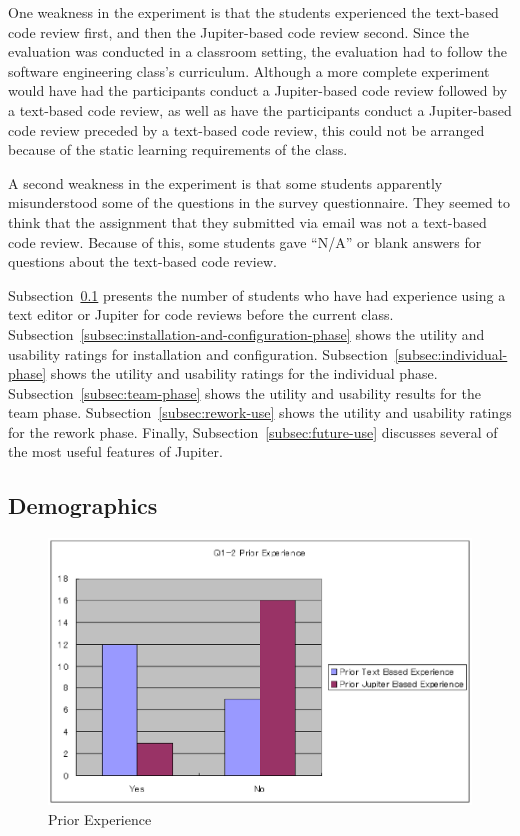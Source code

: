 One weakness in the experiment is that the students experienced the text-based code review first, and then the Jupiter-based code review second. Since the evaluation was conducted in a classroom setting, the evaluation had to follow the software engineering class's curriculum. Although a more complete experiment would have had the participants conduct a Jupiter-based code review followed by a text-based code review, as well as have the participants conduct a Jupiter-based code review preceded by a text-based code review, this could not be arranged because of the static learning requirements of the class.

A second weakness in the experiment is that some students apparently misunderstood some of the questions in the survey questionnaire. They seemed to think that the assignment that they submitted via email was not a text-based code review. Because of this, some students gave ``N/A'' or blank answers for questions about the text-based code review.

Subsection~\ref{subsec:demographics} presents the number of students who have had experience using a text editor or Jupiter for code reviews before the current class. Subsection~\ref{subsec:installation-and-configuration-phase} shows the utility and usability ratings for installation and configuration. Subsection~\ref{subsec:individual-phase} shows the utility and usability ratings for the individual phase. Subsection~\ref{subsec:team-phase} shows the utility and usability results for the team phase. Subsection~\ref{subsec:rework-use} shows the utility and usability ratings for the rework phase. Finally, Subsection~\ref{subsec:future-use} discusses several of the most useful features of Jupiter.

\subsection{Demographics}
\label{subsec:demographics}

\begin{figure}[htbp]
  \centering
  \includegraphics{images/fig5-1.eps}
  \caption{Prior Experience}
  \label{fig5-1}
\end{figure}

